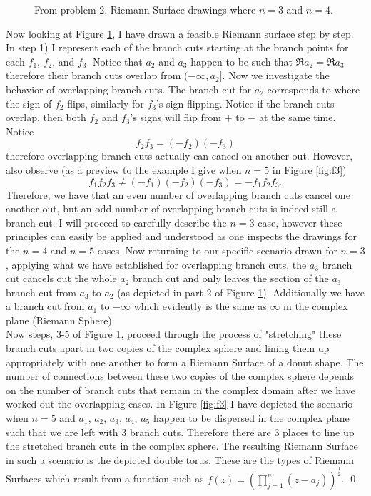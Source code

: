 \documentclass[10pt]{amsart}
\theoremstyle{nonumberplain}
\begin{document}
\begin{enumerate}[label={\bf {\arabic*}:}]
\begin{figure}[h]
 	\caption{
	From problem 2, Riemann Surface drawings where $n=3$ and $n=4$.}\label{fig:f2}
\end{figure}
Now looking at Figure \ref{fig:f2}, I have drawn a feasible Riemann surface step by step.
In step 1) I represent each of the branch cuts starting at the branch points for each $f_1$, $f_2$, and $f_3$.
Notice that $a_2$ and $a_3$ happen to be such that $\Re a_2 = \Re a_3$ therefore their branch cuts overlap from $(-\infty, a_2]$.
Now we investigate the behavior of overlapping branch cuts.
The branch cut for $a_2$ corresponds to where the sign of $f_2$ flips, similarly for $f_3$'s sign flipping.
Notice if the branch cuts overlap, then both $f_2$ and $f_3$'s signs will flip from $+$ to $-$ at the same time.
Notice
$$
f_2f_3 = (-f_2)(-f_3)
$$
therefore overlapping branch cuts actually can cancel on another out.
However, also observe (as a preview to the example I give when $n=5$ in Figure \ref{fig:f3})
$$
f_1f_2f_3 \neq (-f_1)(-f_2)(-f_3) = -f_1f_2f_3.
$$
Therefore, we have that an even number of overlapping branch cuts cancel one another out, but an odd number of overlapping branch cuts is indeed still a branch cut.
I will proceed to carefully describe the $n=3$ case, however these principles can easily be applied and understood as one inspects the drawings for the $n=4$ and $n=5$ cases.
Now returning to our specific scenario drawn for $n=3$, applying what we have established for overlapping branch cuts, the $a_3$ branch cut cancels out the whole $a_2$ branch cut and only leaves the section of the $a_3$ branch cut from $a_3$ to $a_2$ (as depicted in part 2 of Figure \ref{fig:f2}).
Additionally we have a branch cut from $a_1$ to $-\infty$ which evidently is the same as $\infty$ in the complex plane (Riemann Sphere). \\

Now steps, 3-5 of Figure \ref{fig:f2}, proceed through the process of "stretching" these branch cuts apart in two copies of the complex sphere and lining them up appropriately with one another to form a Riemann Surface of a donut shape.
The number of connections between these two copies of the complex sphere depends on the number of branch cuts that remain in the complex domain after we have worked out the overlapping cases.
In Figure \ref{fig:f3} I have depicted the scenario when $n=5$ and $a_1$, $a_2$, $a_3$, $a_4$, $a_5$ happen to be dispersed in the complex plane such that we are left with 3 branch cuts.
Therefore there are 3 places to line up the stretched branch cuts in the complex sphere.
The resulting Riemann Surface in such a scenario is the depicted double torus.
These are the types of Riemann Surfaces which result from a function such as $f(z) = \left(\prod_{j=1}^{n}\left(z-a_j\right)\right)^\frac{1}{2}$.
\qed \\


\end{enumerate}
\end{document}
